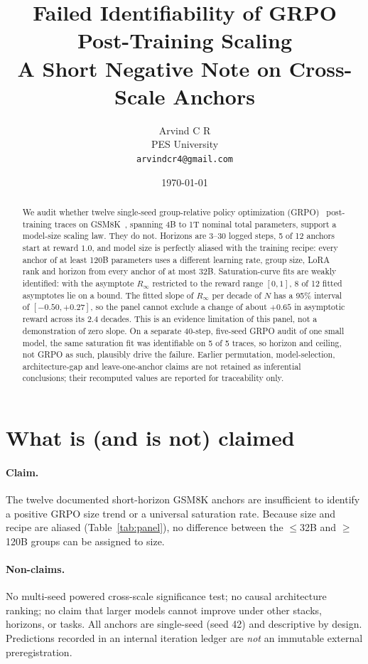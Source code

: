 \documentclass[11pt]{article}
\title{Failed Identifiability of GRPO Post-Training Scaling\\
\large A Short Negative Note on Cross-Scale Anchors}
\author{Arvind C R\\
PES University\\\texttt{arvindcr4@gmail.com}}
\date{\today}
\begin{document}
\maketitle

\begin{abstract}
We audit whether twelve single-seed group-relative policy optimization
(GRPO)~\cite{shao2024deepseekmath} post-training traces on GSM8K~\cite{cobbe2021gsm8k},
spanning 4B to 1T nominal total parameters, support a model-size scaling law.
They do not. Horizons are 3--30 logged steps, 5 of 12 anchors start at reward
$1.0$, and model size is perfectly aliased with the training recipe: every
anchor of at least 120B parameters uses a different learning rate, group size,
LoRA rank and horizon from every anchor of at most 32B. Saturation-curve fits are
weakly identified: with the asymptote $R_\infty$ restricted to the reward range
$[0,1]$, 8 of 12 fitted asymptotes lie on a bound. The fitted slope of $R_\infty$
per decade of $N$ has a 95\% interval of $[-0.50,+0.27]$, so the panel cannot
exclude a change of about $+0.65$ in asymptotic reward across its 2.4 decades.
This is an evidence limitation of this panel, not a demonstration of zero slope.
On a separate 40-step, five-seed GRPO audit of one small model, the same
saturation fit was identifiable on 5 of 5 traces, so horizon and ceiling, not
GRPO as such, plausibly drive the failure. Earlier permutation,
model-selection, architecture-gap and leave-one-anchor claims are not retained
as inferential conclusions; their recomputed values are reported for
traceability only.
\end{abstract}

\section{What is (and is not) claimed}

\paragraph{Claim.} The twelve documented short-horizon GSM8K anchors are
insufficient to identify a positive GRPO size trend or a universal saturation
rate. Because size and recipe are aliased (Table~\ref{tab:panel}), no
difference between the $\le$32B and $\ge$120B groups can be assigned to size.

\paragraph{Non-claims.} No multi-seed powered cross-scale significance test; no
causal architecture ranking; no claim that larger models cannot improve under
other stacks, horizons, or tasks. All anchors are single-seed (seed 42) and
descriptive by design. Predictions recorded in an internal iteration ledger are
\emph{not} an immutable external preregistration.
\end{document}
